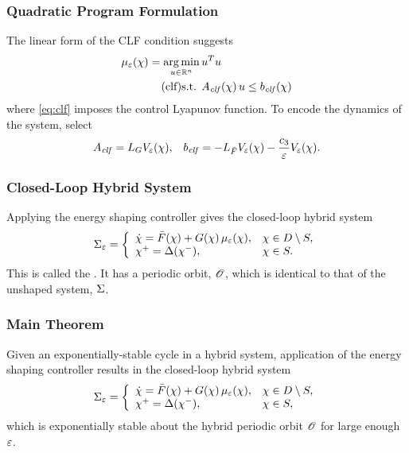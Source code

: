 \begin{frame}[t]
  \frametitle{Quadratic Program Formulation}
  The linear form of the CLF condition suggests
  \begin{align}
    \nonumber
    \mueps\arx = \argmin_{\uu \in \R^{n}}  \, & \uu^T \uu\\
    \label{eq:clf} \tag{clf}
    \mbox{s.t. } & \Aclf\arx \, \uu \leq \bclf\arx%
  \end{align}
  where \eqref{eq:clf} imposes the control Lyapunov function. To encode the dynamics of the system, select
  \begin{align*}
    A_{\mathit{clf}} = L_{G}V_{\varepsilon}(\chi), && b_{\mathit{clf}} = -L_{{\bar {F}}}V_{\varepsilon}(\chi) - \frac{c_{3}}{\varepsilon} V_{\varepsilon}(\chi).
  \end{align*}
\end{frame}

\begin{frame}[t]
  \frametitle{Closed-Loop Hybrid System}
  Applying the energy shaping controller gives the closed-loop hybrid system
  \begin{align*}
    \Sigma_{\varepsilon} = \left\{
      \begin{array}{l l}
        {\dot {\chi}} = {\bar {F}}(\chi) + G(\chi) \, \mu_{\varepsilon}(\chi), & \chi \in D \setminus S,\\
        \chi^{+} = \Delta(\chi^{-}), & \chi \in S.
      \end{array}\right.
  \end{align*}
  This is called the . It has a periodic orbit, $\mathscr O$,
  which is identical to that of the unshaped system, $\Sigma$.
\end{frame}


\begin{frame}[t]
  \frametitle{Main Theorem}

  \begin{theorem}
    Given an exponentially-stable cycle in a hybrid system, application
    of the energy shaping controller results in the closed-loop hybrid system
    \begin{align*}
      \Sigma_{\varepsilon} = \left\{
        \begin{array}{l l}
          {\dot {\chi}} = {\bar {F}}(\chi) + G(\chi) \, \mu_{\varepsilon}(\chi), & \chi \in D \setminus S,\\
          \chi^{+} = \Delta(\chi^{-}), & \chi \in S,
        \end{array}\right.
    \end{align*}
    which is exponentially stable about the hybrid periodic orbit $\mathscr O$ for
    large enough $\varepsilon$.
    
  \end{theorem}
\end{frame}

